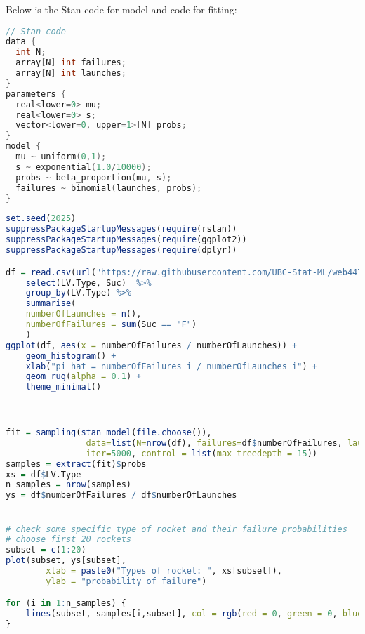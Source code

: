 \documentclass{article}
\begin{document}

Below is the Stan code for model and code for fitting:
\begin{lstlisting}[language=C]
// Stan code
data { 
  int N; 
  array[N] int failures;
  array[N] int launches;
}
parameters { 
  real<lower=0> mu;
  real<lower=0> s;
  vector<lower=0, upper=1>[N] probs; 
}
model {
  mu ~ uniform(0,1);
  s ~ exponential(1.0/10000);
  probs ~ beta_proportion(mu, s);
  failures ~ binomial(launches, probs);
}

\end{lstlisting}

\begin{lstlisting}[language=R]
set.seed(2025)
suppressPackageStartupMessages(require(rstan))
suppressPackageStartupMessages(require(ggplot2))
suppressPackageStartupMessages(require(dplyr))

df = read.csv(url("https://raw.githubusercontent.com/UBC-Stat-ML/web447/main/data/launches.csv")) %>%
    select(LV.Type, Suc)  %>%
    group_by(LV.Type) %>%
    summarise(
    numberOfLaunches = n(),
    numberOfFailures = sum(Suc == "F")
    )
ggplot(df, aes(x = numberOfFailures / numberOfLaunches)) +
    geom_histogram() + 
    xlab("pi_hat = numberOfFailures_i / numberOfLaunches_i") +
    geom_rug(alpha = 0.1) + 
    theme_minimal()



fit = sampling(stan_model(file.choose()), 
                data=list(N=nrow(df), failures=df$numberOfFailures, launches=df$numberOfLaunches),
                iter=5000, control = list(max_treedepth = 15))
samples = extract(fit)$probs
xs = df$LV.Type
n_samples = nrow(samples)
ys = df$numberOfFailures / df$numberOfLaunches


# check some specific type of rocket and their failure probabilities
# choose first 20 rockets
subset = c(1:20)
plot(subset, ys[subset],
        xlab = paste0("Types of rocket: ", xs[subset]), 
        ylab = "probability of failure")

for (i in 1:n_samples) {
    lines(subset, samples[i,subset], col = rgb(red = 0, green = 0, blue = 0, alpha = 0.01))
}
\end{lstlisting}





 
\end{document}
